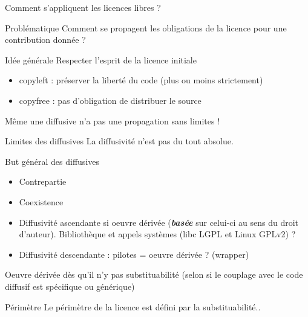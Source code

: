 \documentclass{beamer}
\begin{document}
\begin{frame}{Comment s'appliquent les licences libres ?}
  \begin{alertblock}{Problématique}
    Comment se propagent les obligations de la licence pour une contribution donnée ? 
  \end{alertblock}

  \begin{block}{Idée générale}
    Respecter l'esprit de la licence initiale    
  \end{block}

  \begin{itemize}
  \item copyleft : préserver la liberté du code (plus ou moins strictement)
  \item copyfree : pas d'obligation de distribuer le source
  \end{itemize}

Même une diffusive n'a pas une propagation sans limites !
  
\end{frame}


\begin{frame}{Limites des diffusives}
La diffusivité n'est pas du tout absolue.

  \begin{block}{But général des diffusives}
    \begin{itemize}
    \item Contrepartie
    \item Coexistence
    \end{itemize}
  \end{block}

  \begin{itemize}
  \item Diffusivité ascendante si oeuvre dérivée (\textbf{\textit{basée}} sur celui-ci au sens du droit d'auteur). Bibliothèque et appels systèmes (libc LGPL et Linux GPLv2) ? 
  \item Diffusivité descendante : pilotes = oeuvre dérivée ? (wrapper)
  \end{itemize}

Oeuvre dérivée dès qu'il n'y pas substituabilité (selon si le couplage avec le code diffusif est spécifique ou générique)

  \begin{alertblock}{Périmètre}
    Le périmètre de la licence est défini par la substituabilité..
  \end{alertblock}
\end{frame}
\end{document}
